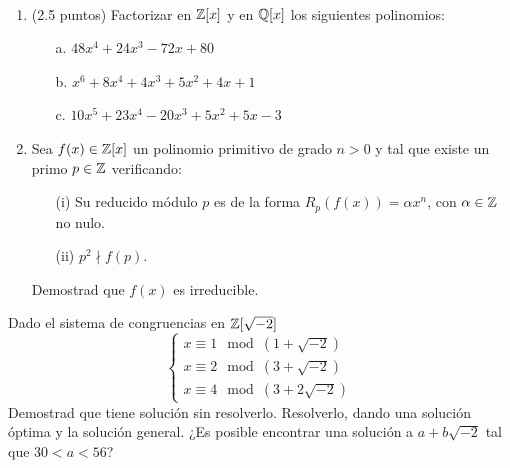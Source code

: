 \documentclass[12pt]{article}
\newcommand{\resetearcontador}{%
  \setcounter{ejercicio}{0} %
}
\begin{document}
    \begin{ejercicio}[3.5 puntos]
        \ 
        \begin{enumerate}
            \item (2.5 puntos) Factorizar en $\mathbb{Z}[x]$ y en $\mathbb{Q}[x]$ los siguientes polinomios:
            \begin{enumerate}
                \item[a.] $48x^4 + 24x^3 -72x +80$
                \item[b.] $x^6 + 8x^4 + 4x^3 + 5x^2 + 4x+1$
                \item[c.] $10x^5 + 23x^4 -20x^3 + 5x^2 + 5x-3$
            \end{enumerate}
            \item Sea $f(x) \in \mathbb{Z}[x]$ un polinomio primitivo de grado $n>0$ y tal que existe un primo $p \in \mathbb{Z}$ verificando:
                \begin{enumerate}
                    \item[(i)] Su reducido módulo $p$ es de la forma $R_p(f(x)) = \alpha x^n$, con $\alpha \in \mathbb{Z}$ no nulo.
                    \item[(ii)] $p^2 \nmid f(p)$. 
                \end{enumerate}
                Demostrad que $f(x)$ es irreducible.
        \end{enumerate}
    \end{ejercicio}

    \begin{ejercicio}[2.5 puntos]
        Dado el sistema de congruencias en $\mathbb{Z}[\sqrt{-2}]$
        $$\left\{ \begin{array}{l}
            x \equiv 1 \mod (1+\sqrt{-2}) \\
            x \equiv 2 \mod (3+\sqrt{-2}) \\
            x \equiv 4 \mod (3+2\sqrt{-2}) 
        \end{array}\right.$$
        Demostrad que tiene solución sin resolverlo. Resolverlo, dando una solución óptima y la solución general. \newline
        ¿Es posible encontrar una solución a $a + b\sqrt{-2}$ tal que $30 < a < 56$?
    \end{ejercicio}

    \newpage
    \ %
    \newpage
    \resetearcontador
    
\end{document}

